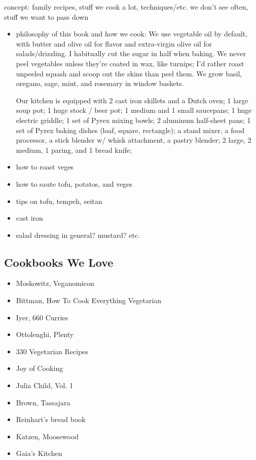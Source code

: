 concept: family recipes, stuff we cook a lot, techniques/etc. we don't see often, stuff we want to pass down

\begin{itemize}
 \item philosophy of this book and how we cook: We use vegetable oil by default, with butter and olive oil for flavor and extra-virgin olive oil for salads/drizzling. I habitually cut the sugar in half when baking. We never peel vegetables unless they're coated in wax, like turnips; I'd rather roast unpeeled squash and scoop out the skins than peel them. We grow basil, oregano, sage, mint, and rosemary in window baskets.

       Our kitchen is equipped with 2 cast iron skillets and a Dutch oven; 1 large soup pot; 1 huge stock / beer pot; 1 medium and 1 small saucepans; 1 huge electric griddle; 1 set of Pyrex mixing bowls; 2 aluminum half-sheet pans; 1 set of Pyrex baking dishes (loaf, square, rectangle); a stand mixer, a food processor, a stick blender w/ whisk attachment, a pastry blender; 2 large, 2 medium, 1 paring, and 1 bread knife;

 \item how to roast veges
 \item how to saute tofu, potatos, and veges
 \item tips on tofu, tempeh, seitan
 \item cast iron
 \item salad dressing in general? mustard? etc.
\end{itemize}

\subsection{Cookbooks We Love}
\begin{itemize}
 \item Moskowitz, Veganomicon
 \item Bittman, How To Cook Everything Vegetarian
 \item Iyer, 660 Curries
 \item Ottolenghi, Plenty
 \item 330 Vegetarian Recipes
 \item Joy of Cooking
 \item Julia Child, Vol. 1
 \item Brown, Tassajara
 \item Reinhart’s bread book
 \item Katzen, Moosewood
 \item Gaia’s Kitchen
\end{itemize}


